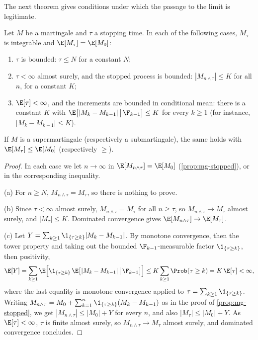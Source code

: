 The next theorem gives conditions under which the passage to the limit is legitimate.

\begin{theorem}\label{thm:mg-optional-stopping}
Let $M$ be a martingale and $\tau$ a stopping time. In each of the following cases, $M_\tau$ is
integrable and $\E[M_\tau]=\E[M_0]$:
\begin{enumerate}[label=(\alph*)]
  \item $\tau$ is bounded: $\tau\le N$ for a constant $N$;
  \item $\tau<\infty$ almost surely, and the stopped process is bounded: $|M_{n\wedge\tau}|\le K$
    for all $n$, for a constant $K$;
  \item $\E[\tau]<\infty$, and the increments are bounded in conditional mean: there is a
    constant $K$ with $\E\big[|M_k-M_{k-1}|\,\big|\,\F_{k-1}\big]\le K$ for every $k\ge1$ (for
    instance, $|M_k-M_{k-1}|\le K$).
\end{enumerate}
If $M$ is a supermartingale (respectively a submartingale), the same holds with
$\E[M_\tau]\le\E[M_0]$ (respectively $\ge$).
\end{theorem}

\begin{proof}
In each case we let $n\to\infty$ in $\E[M_{n\wedge\tau}]=\E[M_0]$ (\cref{prop:mg-stopped}),
or in the corresponding inequality.

(a) For $n\ge N$, $M_{n\wedge\tau}=M_\tau$, so there is nothing to prove.

(b) Since $\tau<\infty$ almost surely, $M_{n\wedge\tau}=M_\tau$ for all $n\ge\tau$, so
$M_{n\wedge\tau}\to M_\tau$ almost surely, and $|M_\tau|\le K$. Dominated convergence gives
$\E[M_{n\wedge\tau}]\to\E[M_\tau]$.

(c) Let $Y=\sum_{k\ge1}\1_{\{\tau\ge k\}}|M_k-M_{k-1}|$. By monotone convergence, then the
tower property and taking out the bounded $\F_{k-1}$-measurable factor
$\1_{\{\tau\ge k\}}$, then positivity,
\[
  \E[Y]=\sum_{k\ge1}\E\Big[\1_{\{\tau\ge k\}}\,\E\big[|M_k-M_{k-1}|\,\big|\,\F_{k-1}\big]\Big]
  \le K\sum_{k\ge1}\Prob(\tau\ge k)=K\,\E[\tau]<\infty ,
\]
where the last equality is monotone convergence applied to $\tau=\sum_{k\ge1}\1_{\{\tau\ge k\}}$.
Writing $M_{n\wedge\tau}=M_0+\sum_{k=1}^{n}\1_{\{\tau\ge k\}}(M_k-M_{k-1})$ as in the proof of
\cref{prop:mg-stopped}, we get $|M_{n\wedge\tau}|\le|M_0|+Y$ for every $n$, and also
$|M_\tau|\le|M_0|+Y$. As $\E[\tau]<\infty$, $\tau$ is finite almost surely, so
$M_{n\wedge\tau}\to M_\tau$ almost surely, and dominated convergence concludes.
\end{proof}

